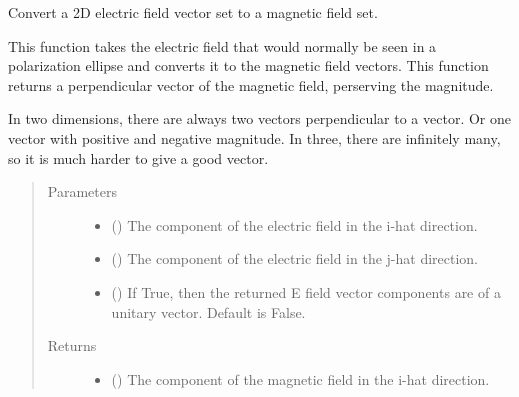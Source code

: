 \documentclass[letterpaper,10pt,english]{sphinxmanual}
\begin{document}
\begin{fulllineitems}
\label{\detokenize{Backend.electromagnetic_field_polarization:Backend.electromagnetic_field_polarization.electric_to_magnetic}}
Convert a 2D electric field vector set to a magnetic field set.

This function takes the electric field that would normally be seen
in a polarization ellipse and converts it to the magnetic field
vectors. This function returns a perpendicular vector of the
magnetic field, perserving the magnitude.

In two dimensions, there are always two vectors perpendicular to a vector.
Or one vector with positive and negative magnitude. In three, there are
infinitely many, so it is much harder to give a good vector.
\begin{quote}\begin{description}
\item[{Parameters}] \leavevmode\begin{itemize}
\item {} 
 () \textendash{} The component of the electric field in the i-hat direction.

\item {} 
 () \textendash{} The component of the electric field in the j-hat direction.

\item {} 
 () \textendash{} If True, then the returned E field vector components are of a unitary
vector. Default is False.

\end{itemize}

\item[{Returns}] \leavevmode
\begin{itemize}
\item {} 
 () \textendash{} The component of the magnetic field in the i-hat direction.


\end{itemize}
\end{description}
\end{quote}
\end{fulllineitems}
\end{document}

